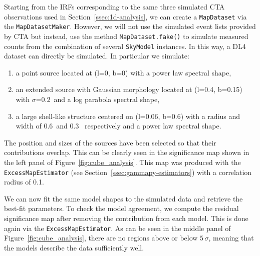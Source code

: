 \documentclass[longauth]{aa}
\newcommand{\code}[1]{\texttt{#1}}
\newcommand{\cta}{CTA\xspace}
\newcommand{\irfs}{IRFs\xspace}
\begin{document}
Starting from the \irfs corresponding to the same three simulated \cta
observations used in Section~\ref{ssec:1d-analysis}, we can create a \code{MapDataset}
via the \code{MapDatasetMaker}. However, we will not use the simulated event lists
provided by \cta but instead, use the method \code{MapDataset.fake()} to simulate
measured counts from the combination of several \code{SkyModel} instances. In this
way, a DL4 dataset can directly be simulated. In particular we simulate:
\begin{enumerate}
    \item a point source located at (l=0\textdegree, b=0\textdegree) with a power law
              spectral shape,
    \item an extended source with Gaussian morphology located at (l=0.4\textdegree,
              b=0.15\textdegree) with $\sigma$=0.2\textdegree~and a log parabola spectral
              shape,
    \item a large shell-like structure centered on (l=0.06\textdegree,
              b=0.6\textdegree) with a radius and width of 0.6\textdegree~and 0.3\textdegree~
              respectively and a power law spectral shape.
\end{enumerate}

The position and sizes of the sources
have been selected so that their contributions overlap. This can be clearly
seen in the significance map shown in the left panel of
Figure~\ref{fig:cube_analysis}. This map was produced with the
\code{ExcessMapEstimator} (see Section~\ref{ssec:gammapy-estimators}) with a
correlation radius of 0.1\textdegree.

We can now fit the same model shapes to the simulated data and retrieve the
best-fit parameters. To check the model agreement, we compute the residual
significance map after removing the contribution from each model. This is done
again via the \code{ExcessMapEstimator}. As can be seen in the middle panel of
Figure~\ref{fig:cube_analysis}, there are no regions above or below $5\,\sigma$,
meaning that the models describe the data sufficiently well.
\end{document}
